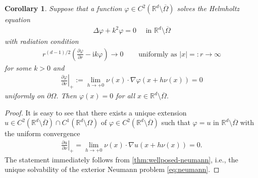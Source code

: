 \documentclass{article}
\theoremstyle{plain}
\newtheorem{cor}[thm]{Corollary}
\theoremstyle{definition}
\begin{document}
\begin{cor}
    Suppose that a function $\varphi\in C^2(\mathbb R^d\setminus\overline\Omega)$ solves the Helmholtz equation
    \begin{align*}
        \varDelta \varphi + k^2 \varphi  = 0 \quad\text{ in }\mathbb R^d\setminus\overline\Omega
    \end{align*}
    with radiation condition
    \begin{align*}
        r^{(d-1)/2}\left( \frac{\partial \varphi}{\partial r} - \mathrm ik\varphi\right) \to 0  \quad &\text{ uniformly as } |x|=:r\to\infty
    \end{align*}
    for some $k>0$ and 
    \begin{align}\label{eq:tmp1}
        \left.\frac{\partial \varphi}{\partial\nu}\right|_+ 
 := \lim_{h\to+0} \nu(x)\cdot \nabla\varphi (x+h\nu(x)) = 0 
    \end{align}
    uniformly on $\partial\Omega$. Then $\varphi (x)=0$ for all $x\in \mathbb R^d\setminus\overline\Omega$.
\end{cor}
\begin{proof}
    It is easy to see that there exists a unique extension $u\in C^2(\mathbb R^d\setminus\overline\Omega) \cap C^1(\mathbb R^d\setminus\Omega)$ of $\varphi\in C^2(\mathbb R^d\setminus\overline\Omega)$ such that $\varphi = u$ in $\mathbb R^d\setminus\overline\Omega$ with the uniform convergence 
    \begin{align*}
        \left.\frac{\partial u}{\partial\nu}\right|_+ = \lim_{h\to+0} \nu(x)\cdot \nabla u (x+h\nu(x)) = 0 .
    \end{align*}
    The statement immediately follows from \cref{thm:wellposed-neumann}, i.e., the unique solvability of the exterior Neumann problem \cref{eq:neumann}.
\end{proof}
\end{document}
